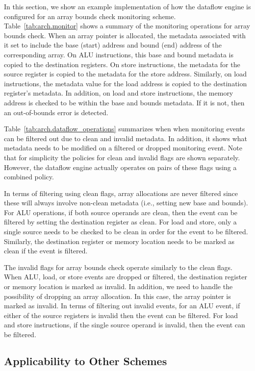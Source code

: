 In this section, we show an example implementation of how the dataflow engine
is configured for an array bounds check monitoring scheme.
Table~\ref{tab:arch.monitor} shows a summary of the monitoring operations for
array bounds check.  When an array pointer is allocated, the metadata
associated with it set to include the base (start) address and bound (end)
address of the corresponding array. On ALU instructions, this base and bound
metadata is copied to the destination registers. On store instructions, the
metadata for the source register is copied to the metadata for the store
address. Similarly, on load instructions, the metadata value for the load
address is copied to the destination register's metadata. In addition, on load
and store instructions, the memory address is checked to be within the base and
bounds metadata. If it is not, then an out-of-bounds error is detected. 

Table~\ref{tab:arch.dataflow_operations} summarizes when when monitoring events
can be filtered out due to clean and invalid metadata. In addition, it shows
what metadata needs to be modified on a filtered or dropped monitoring event.
Note that for simplicity the policies for clean and invalid flags are shown
separately. However, the dataflow engine actually operates on pairs of these
flags using a combined policy.

In terms of filtering using clean flags, array allocations are never filtered
since these will always involve non-clean metadata (i.e., setting new base and
bounds). For ALU operations, if both source operands are clean, then the event
can be filtered by setting the destination register as clean. For load and
store, only a single source needs to be checked to be clean in order for the
event to be filtered. Similarly, the destination register or memory location
needs to be marked as clean if the event is filtered.

The invalid flags for array bounds check operate similarly to the clean flags.
When ALU, load, or store events are dropped or filtered, the destination
register or memory location is marked as invalid. In addition, we need to
handle the possibility of dropping an array allocation. In this case, the array
pointer is marked as invalid. In terms of filtering out invalid events, for an
ALU event, if either of the source registers is invalid then the event can be
filtered. For load and store instructions, if the single source operand is
invalid, then the event can be filtered.

\subsection{Applicability to Other Schemes}

